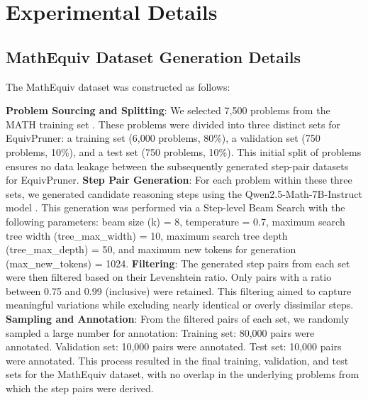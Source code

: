 \documentclass[11pt]{article}
\begin{document}


%


\appendix
\section{Experimental Details}
\label{sec:expdetails}
\subsection{MathEquiv Dataset Generation Details}
\label{app:Dataset_Generation_Details}

The MathEquiv dataset was constructed as follows:

\textbf{Problem Sourcing and Splitting}: We selected 7,500 problems from the MATH training set \citep{hendrycks2021math}. These problems were divided into three distinct sets for EquivPruner: a training set (6,000 problems, 80\%), a validation set (750 problems, 10\%), and a test set (750 problems, 10\%). This initial split of problems ensures no data leakage between the subsequently generated step-pair datasets for EquivPruner.
\textbf{Step Pair Generation}: For each problem within these three sets, we generated candidate reasoning steps using the Qwen2.5-Math-7B-Instruct model \citep{yang2024qwen2}. This generation was performed via a Step-level Beam Search with the following parameters: beam size (k) = 8, temperature = 0.7, maximum search tree width (tree\_max\_width) = 10, maximum search tree depth (tree\_max\_depth) = 50, and maximum new tokens for generation (max\_new\_tokens) = 1024.
\textbf{Filtering}: The generated step pairs from each set were then filtered based on their Levenshtein ratio. Only pairs with a ratio between 0.75 and 0.99 (inclusive) were retained. This filtering aimed to capture meaningful variations while excluding nearly identical or overly dissimilar steps.
\textbf{Sampling and Annotation}: From the filtered pairs of each set, we randomly sampled a large number for annotation:
Training set: 80,000 pairs were annotated.
Validation set: 10,000 pairs were annotated.
Test set: 10,000 pairs were annotated. This process resulted in the final training, validation, and test sets for the MathEquiv dataset, with no overlap in the underlying problems from which the step pairs were derived.
\end{document}
